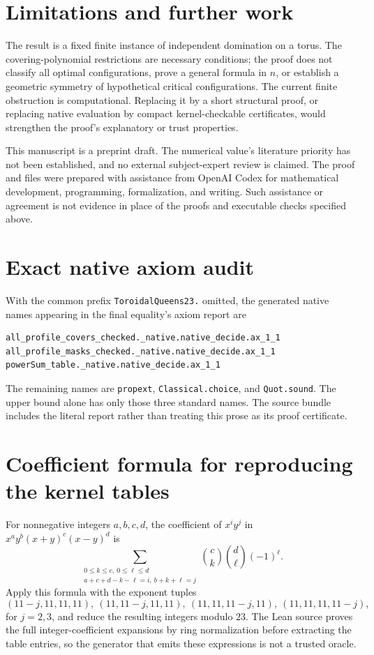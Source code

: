 \documentclass[11pt,a4paper]{article}
\theoremstyle{remark}
\begin{document}
\section{Limitations and further work}
The result is a fixed finite instance of independent domination on a torus.
The covering-polynomial restrictions are necessary conditions; the proof does
not classify all optimal configurations, prove a general formula in $n$, or
establish a geometric symmetry of hypothetical critical configurations.
The current finite obstruction is computational. Replacing it by a short
structural proof, or replacing native evaluation by compact kernel-checkable
certificates, would strengthen the proof's explanatory or trust properties.

This manuscript is a preprint draft. The numerical value's literature priority
has not been established, and no external subject-expert review is claimed.
The proof and files were prepared with assistance from OpenAI Codex for
mathematical development, programming, formalization, and writing. Such
assistance or agreement is not evidence in place of the proofs and executable
checks specified above.

\appendix
\section{Exact native axiom audit}\label{app:audit}
With the common prefix \texttt{ToroidalQueens23.} omitted, the generated native
names appearing in the final equality's axiom report are
\begin{lstlisting}
all_profile_covers_checked._native.native_decide.ax_1_1
all_profile_masks_checked._native.native_decide.ax_1_1
powerSum_table._native.native_decide.ax_1_1
\end{lstlisting}
The remaining names are \texttt{propext}, \texttt{Classical.choice}, and
\texttt{Quot.sound}. The upper bound alone has only those three standard names.
The source bundle includes the literal report rather than treating this prose
as its proof certificate.

\section{Coefficient formula for reproducing the kernel tables}
For nonnegative integers $a,b,c,d$, the coefficient of $x^iy^j$ in
$x^ay^b(x+y)^c(x-y)^d$ is
\[
 \sum_{\substack{0\leq k\leq c,\ 0\leq\ell\leq d\\
                 a+c+d-k-\ell=i,\ b+k+\ell=j}}
     \binom ck\binom d\ell(-1)^\ell.
\]
Apply this formula with the exponent tuples
\[
 (11-j,11,11,11),\ (11,11-j,11,11),\
 (11,11,11-j,11),\ (11,11,11,11-j),
\]
for $j=2,3$, and reduce the resulting integers modulo $23$.
The Lean source proves the full integer-coefficient expansions by ring
normalization before extracting the table entries, so the generator that
emits these expressions is not a trusted oracle.
\end{document}
